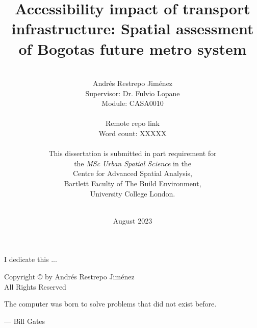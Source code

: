 \documentclass[12pt, a4paper]{report}
\date{August 2023}
\title{Accessibility impact of transport infrastructure: Spatial assessment of Bogota\textquotesingle s future metro system}
\author{\\ \Large{Andr\'{e}s Restrepo Jim\'{e}nez}
\\ Supervisor: Dr. Fulvio Lopane 
\\ Module: CASA0010
\\
\\ Remote repo link
\\ Word count: XXXXX
\\
\\
This dissertation is submitted in part requirement for \\the \textit{MSc Urban Spatial Science} in the \\Centre for Advanced Spatial Analysis, \\Bartlett Faculty of The Build Environment, \\University College London.
\\ \\
}
\begin{document}
      

\thispagestyle{headings}
\maketitle
\FloatBarrier
{}

\thispagestyle{empty}
\begin{abstract}


\end{abstract}
\newpage
\thispagestyle{empty}
\begin{center}
I dedicate this ...
\end{center}

\newpage
\thispagestyle{empty}
\vspace*{\fill}
\begin{center}
Copyright \copyright  {} by Andr\'{e}s Restrepo Jim\'{e}nez \\ All Rights Reserved
\end{center}
\vspace*{\fill}
\newpage
\thispagestyle{empty}
\epigraph{The computer was born to solve problems that did not exist before.}{--- \textup{Bill Gates}}
\end{document}
